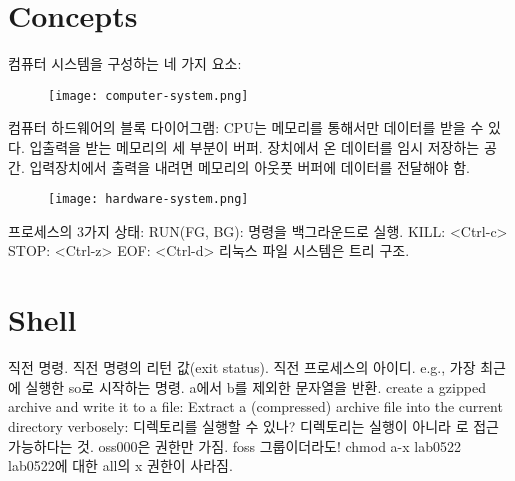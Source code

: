 \section{Concepts}

\bitmz
  \itm 컴퓨터 시스템을 구성하는 네 가지 요소: \begin{figure}[h]\centering\texttt{[image: computer-system.png]}\end{figure}
  \itm 컴퓨터 하드웨어의 블록 다이어그램: CPU는 메모리를 통해서만 데이터를 받을 수 있다. 입출력을 받는 메모리의 세 부분이 버퍼. 장치에서 온 데이터를 임시 저장하는 공간. 입력장치에서 출력을 내려면 메모리의 아웃풋 버퍼에 데이터를 전달해야 함. \begin{figure}[h]\centering\texttt{[image: hardware-system.png]}\end{figure}
  \itm 프로세스의 3가지 상태:
  \bitmz
    \itm RUN(FG, BG): 명령을 백그라운드로 실행.
    \itm KILL: <Ctrl-c>
    \itm STOP: <Ctrl-z>
  \eitmz
  \itm EOF: <Ctrl-d>
  \itm 리눅스 파일 시스템은 트리 구조.
\eitmz

\section{Shell}

\bitmz
  \itm \code{!!} \rarr 직전 명령.
  \itm {} \rarr 직전 명령의 리턴 값(exit status).
  \itm \code{\$!} \rarr 직전 프로세스의 아이디. e.g., 
  \itm {} \rarr 가장 최근에 실행한 so로 시작하는 명령.
  \itm {} \rarr a에서 b를 제외한 문자열을 반환.
  \itm create a gzipped archive and write it to a file: 
  \itm Extract a (compressed) archive file into the current directory verbosely: 
  \itm {} 디렉토리를 실행할 수 있나? \rarr 디렉토리는 실행이 아니라 로 접근 가능하다는 것.
  \itm {} \rarr oss000은  권한만 가짐. foss 그룹이더라도!
  \itm chmod a-x lab0522 \rarr lab0522에 대한 all의 x 권한이 사라짐.
  \itm {} 


